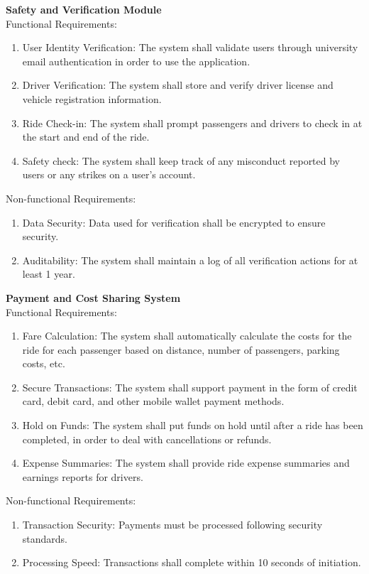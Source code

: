 \documentclass[12pt,letterpaper]{article}
\begin{document}
\vspace{1em}
\noindent \textbf{Safety and Verification Module} \\
Functional Requirements:
\begin{enumerate}
  \item User Identity Verification: The system shall validate users through university email authentication in order to use the application.
  \item Driver Verification: The system shall store and verify driver license and vehicle registration information.
  \item Ride Check-in: The system shall prompt passengers and drivers to check in at the start and end of the ride.
  \item Safety check: The system shall keep track of any misconduct reported by users or any strikes on a user’s account.
\end{enumerate}
Non-functional Requirements:
\begin{enumerate}
  \item Data Security: Data used for verification shall be encrypted to ensure security.
  \item Auditability: The system shall maintain a log of all verification actions for at least 1 year.
\end{enumerate}
\vspace{1em}
\noindent \textbf{Payment and Cost Sharing System} \\
Functional Requirements:
\begin{enumerate}
  \item Fare Calculation: The system shall automatically calculate the costs for the ride for each passenger based on distance, number of passengers, parking costs, etc.
  \item Secure Transactions: The system shall support payment in the form of credit card, debit card, and other mobile wallet payment methods.
  \item Hold on Funds: The system shall put funds on hold until after a ride has been completed, in order to deal with cancellations or refunds.
  \item Expense Summaries: The system shall provide ride expense summaries and earnings reports for drivers.
\end{enumerate}
Non-functional Requirements:
\begin{enumerate}
  \item Transaction Security: Payments must be processed following security standards.
  \item Processing Speed: Transactions shall complete within 10 seconds of initiation.
\end{enumerate}
\end{document}
